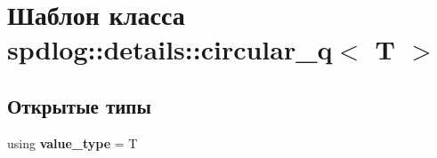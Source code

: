 \hypertarget{classspdlog_1_1details_1_1circular__q}{}\section{Шаблон класса spdlog\+:\+:details\+:\+:circular\+\_\+q$<$ T $>$}
\label{classspdlog_1_1details_1_1circular__q}
\subsection*{Открытые типы}
\begin{DoxyCompactItemize}
\item 
\mbox{\label{classspdlog_1_1details_1_1circular__q_ac609195d3a9f1c0a7df583b1e3c1315b}} 
using {\bfseries value\+\_\+type} = T
\end{DoxyCompactItemize}
